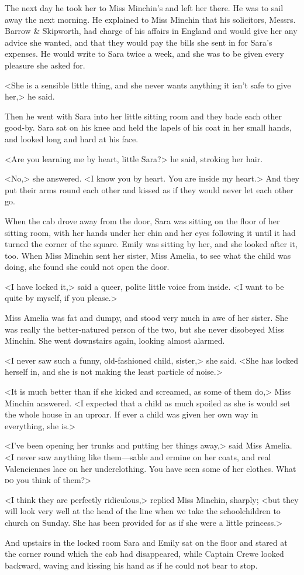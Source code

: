 The next day he took her to Miss Minchin's and left her there. He was to sail away the next morning. He explained to Miss Minchin that his solicitors, Messrs. Barrow \& Skipworth, had charge of his affairs in England and would give her any advice she wanted, and that they would pay the bills she sent in for Sara's expenses. He would write to Sara twice a week, and she was to be given every pleasure she asked for.

<She is a sensible little thing, and she never wants anything it isn't safe to give her,> he said.

Then he went with Sara into her little sitting room and they bade each other good-by. Sara sat on his knee and held the lapels of his coat in her small hands, and looked long and hard at his face.

<Are you learning me by heart, little Sara?> he said, stroking her hair.

<No,> she answered. <I know you by heart. You are inside my heart.> And they put their arms round each other and kissed as if they would never let each other go.

When the cab drove away from the door, Sara was sitting on the floor of her sitting room, with her hands under her chin and her eyes following it until it had turned the corner of the square. Emily was sitting by her, and she looked after it, too. When Miss Minchin sent her sister, Miss Amelia, to see what the child was doing, she found she could not open the door.

<I have locked it,> said a queer, polite little voice from inside. <I want to be quite by myself, if you please.>

Miss Amelia was fat and dumpy, and stood very much in awe of her sister. She was really the better-natured person of the two, but she never disobeyed Miss Minchin. She went downstairs again, looking almost alarmed.

<I never saw such a funny, old-fashioned child, sister,> she said. <She has locked herself in, and she is not making the least particle of noise.>

<It is much better than if she kicked and screamed, as some of them do,> Miss Minchin answered. <I expected that a child as much spoiled as she is would set the whole house in an uproar. If ever a child was given her own way in everything, she is.>

<I've been opening her trunks and putting her things away,> said Miss Amelia. <I never saw anything like them—sable and ermine on her coats, and real Valenciennes lace on her underclothing. You have seen some of her clothes. What \textsc{do} you think of them?>

<I think they are perfectly ridiculous,> replied Miss Minchin, sharply; <but they will look very well at the head of the line when we take the schoolchildren to church on Sunday. She has been provided for as if she were a little princess.>

And upstairs in the locked room Sara and Emily sat on the floor and stared at the corner round which the cab had disappeared, while Captain Crewe looked backward, waving and kissing his hand as if he could not bear to stop.